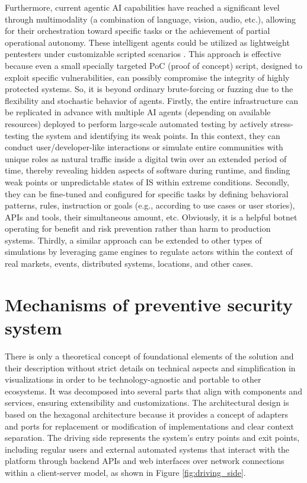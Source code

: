 Furthermore, current agentic AI capabilities have reached a significant level through multimodality (a combination of language, vision, audio, etc.), allowing for their orchestration toward specific tasks or the achievement of partial operational autonomy. These intelligent agents could be utilized as lightweight pentesters under customizable scripted scenarios \cite{anthropic2025disrupting}. This approach is effective because even a small specially targeted PoC (proof of concept) script, designed to exploit specific vulnerabilities, can possibly compromise the integrity of highly protected systems. So, it is beyond ordinary brute-forcing or fuzzing due to the flexibility and stochastic behavior of agents. Firstly, the entire infrastructure can be replicated in advance with multiple AI agents (depending on available resources) deployed to perform large-scale automated testing by actively stress- testing the system and identifying its weak points. In this context, they can conduct user/developer-like interactions or simulate entire communities with unique roles as natural traffic inside a digital twin over an extended period of time, thereby revealing hidden aspects of software during runtime, and finding weak points or unpredictable states of IS within extreme conditions. Secondly, they can be fine-tuned and configured for specific tasks by defining behavioral patterns, rules, instruction or goals (e.g., according to use cases or user stories), APIs and tools, their simultaneous amount, etc. Obviously, it is a helpful botnet operating for benefit and risk prevention rather than harm to production systems. Thirdly, a similar approach can be extended to other types of simulations by leveraging game engines to regulate actors within the context of real markets, events, distributed systems, locations, and other cases.

\section{Mechanisms of preventive security system}

There is only a theoretical concept of foundational elements of the solution and their description without strict details on technical aspects and simplification in visualizations in order to be technology-agnostic and portable to other ecosystems. It was decomposed into several parts that align with components and services, ensuring extensibility and customizations. The architectural design is based on the hexagonal architecture because it provides a concept of adapters and ports for replacement or modification of implementations and clear context separation. The driving side represents the system's entry points and exit points, including regular users and external automated systems that interact with the platform through backend APIs and web interfaces over network connections within a client-server model, as shown in Figure \ref{fig:driving_side}.

